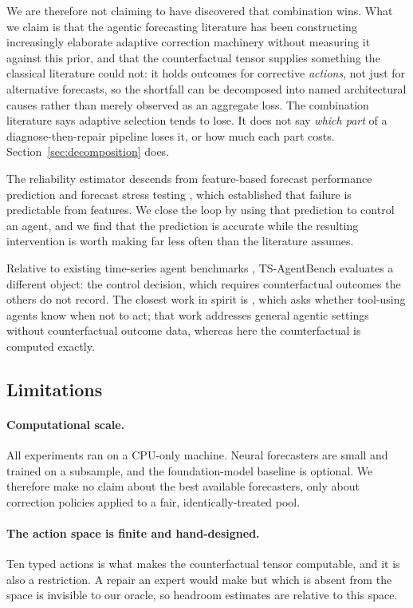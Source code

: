 We are therefore not claiming to have discovered that combination wins. What we claim is
that the agentic forecasting literature has been constructing increasingly elaborate
adaptive correction machinery without measuring it against this prior, and that the
counterfactual tensor supplies something the classical literature could not: it holds
outcomes for corrective \emph{actions}, not just for alternative forecasts, so the
shortfall can be decomposed into named architectural causes rather than merely observed
as an aggregate loss. The combination literature says adaptive selection tends to lose.
It does not say \emph{which part} of a diagnose-then-repair pipeline loses it, or how
much each part costs. Section~\ref{sec:decomposition} does.

The reliability estimator descends from feature-based forecast performance prediction
\citep{fformpp2019} and forecast stress testing \citep{mast2025}, which established that
failure is predictable from features. We close the loop by using that prediction to
control an agent, and we find that the prediction is accurate while the resulting
intervention is worth making far less often than the literature assumes.

Relative to existing time-series agent benchmarks
\citep{temporalbench2026,timesagemt2026,timeseriesgym2025,aion2026}, TS-AgentBench
evaluates a different object: the control decision, which requires counterfactual
outcomes the others do not record. The closest work in spirit is
\citet{agentabstain2026}, which asks whether tool-using agents know when not to act; that
work addresses general agentic settings without counterfactual outcome data, whereas here
the counterfactual is computed exactly.

\subsection{Limitations}

\paragraph{Computational scale.}
All experiments ran on a CPU-only machine. Neural forecasters are small and trained on a
subsample, and the foundation-model baseline is optional. We therefore make no claim
about the best available forecasters, only about correction policies applied to a fair,
identically-treated pool.

\paragraph{The action space is finite and hand-designed.}
Ten typed actions is what makes the counterfactual tensor computable, and it is also a
restriction. A repair an expert would make but which is absent from the space is
invisible to our oracle, so headroom estimates are relative to this space.

